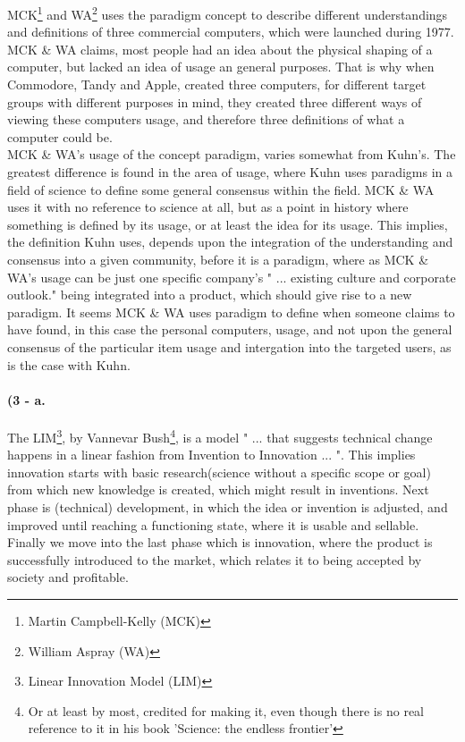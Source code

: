 \documentclass[paper=a4, fontsize=12pt]{scrartcl} %
\numberwithin{equation}{section} %
\numberwithin{figure}{section} %
\numberwithin{table}{section} %
\begin{document}
	MCK\footnote{Martin Campbell-Kelly (MCK)} and WA\footnote{William Aspray (WA)} uses the paradigm concept to describe different understandings and definitions of three commercial computers, which were launched during 1977\cite{MCKWA220}. MCK \& WA claims, most people had an idea about the physical shaping of a computer, but lacked an idea of usage an general purposes\cite{MCKWA221}. That is why when Commodore, Tandy and Apple, created three computers, for different target groups with different purposes in mind, they created three different ways of viewing these computers usage, and therefore three definitions of what a computer could be. \\
	MCK \& WA's usage of the concept paradigm, varies somewhat from Kuhn's. The greatest difference is found in the area of usage, where Kuhn uses paradigms in a field of science to define some general consensus within the field. MCK \& WA uses it with no reference to science at all, but as a point in history where something is defined by its usage, or at least the idea for its usage. This implies, the definition Kuhn uses, depends upon the integration of the understanding and consensus into a given community, before it is a paradigm, where as MCK \& WA's usage can be just one specific company's " ... existing culture and corporate outlook."\cite{MCKWA220} being integrated into a product, which should give rise to a new paradigm. It seems MCK \& WA uses paradigm to define when someone claims to have found, in this case the personal computers, usage, and not upon the general consensus of the particular item usage and intergation into the targeted users, as is the case with Kuhn. 

	\paragraph{(3 - a.}
	
	The LIM\footnote{Linear Innovation Model (LIM)}, by Vannevar Bush\footnote{Or at least by most, credited for making it, even though there is no real reference to it in his book 'Science: the endless frontier'\cite{GODIN4}}, is a model " ... that suggests technical change happens in a linear fashion from Invention to Innovation ... "\cite{WIKILMOI}. This implies innovation starts with basic research(science without a specific scope or goal) from which new knowledge is created, which might result in inventions. Next phase is (technical) development, in which the idea or invention is adjusted, and improved until reaching a functioning state, where it is usable and sellable. Finally we move into the last phase which is innovation, where the product is successfully introduced to the market, which relates it to being accepted by society and profitable.
\end{document}
